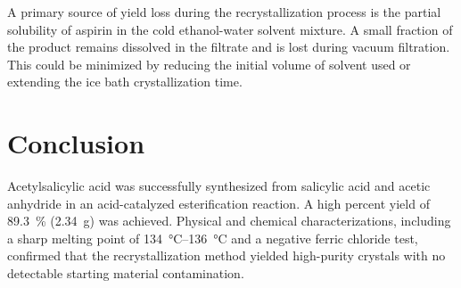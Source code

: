 \documentclass[11pt,a4paper]{article}
\begin{document}
A primary source of yield loss during the recrystallization process is the partial solubility of aspirin in the cold ethanol-water solvent mixture. A small fraction of the product remains dissolved in the filtrate and is lost during vacuum filtration. This could be minimized by reducing the initial volume of solvent used or extending the ice bath crystallization time.

\section{Conclusion}
Acetylsalicylic acid was successfully synthesized from salicylic acid and acetic anhydride in an acid-catalyzed esterification reaction. A high percent yield of \qty{89.3}{\percent} (\qty{2.34}{\gram}) was achieved. Physical and chemical characterizations, including a sharp melting point of \qtyrange{134}{136}{\degreeCelsius} and a negative ferric chloride test, confirmed that the recrystallization method yielded high-purity crystals with no detectable starting material contamination.
\end{document}
